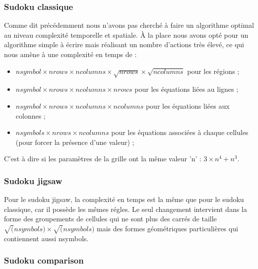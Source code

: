 \documentclass[a4paper,8pt,french,fleqn]{article}
\begin{document}
\subsubsection*{Sudoku classique}

Comme dit précédemment nous n'avons pas cherché à faire un algorithme optimal au niveau complexité temporelle et spatiale. \`A  la place nous avons opté pour un algorithme simple à écrire mais réalisant un nombre d'actions très élevé, ce qui nous amène à une complexité en temps de :\\
 
\begin{itemize}
  
\item $nsymbol \times nrows \times ncolumns \times \sqrt{nrows} \times \sqrt{ncolumns}$ pour les régions ; \\
  
\item $nsymbol \times nrows \times ncolumns \times nrows$ pour les équations liées au lignes ; \\

\item $nsymbol \times nrows \times ncolumns \times ncolumns$ pour les équations liées aux colonnes ; \\

\item $nsymbols \times nrows \times ncolumns$ pour les équations associées à chaque cellules (pour forcer la présence d'une valeur) ;\\

\end{itemize}

C'est à dire si les paramètres de la grille ont la même valeur 'n' : $3 \times n^{4} + n^{3}$. 

\subsubsection*{Sudoku jigsaw}

Pour le sudoku jigsaw, la complexité en temps est la même que pour le sudoku classique, car il possède les mêmes régles. Le seul changement intervient dans la forme des groupements de cellules qui ne sont plus des carrés de taille $\sqrt(nsymbols) \times \sqrt(nsymbols)$ mais des formes géométriques particulières qui contiennent aussi nsymbols.

\subsubsection*{Sudoku comparison}
\end{document}
